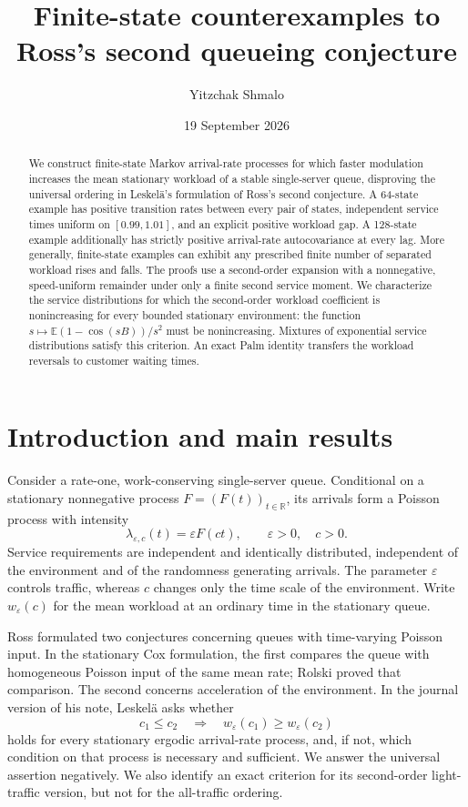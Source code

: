\documentclass[11pt,reqno]{amsart}
\title[Counterexamples to Ross's second queueing conjecture]{Finite-state counterexamples to Ross's second queueing conjecture}
\author{Yitzchak Shmalo}
\date{19 September 2026}
\numberwithin{equation}{section}
\theoremstyle{plain}
\theoremstyle{definition}
\newcommand{\E}{\mathbb E}
\newcommand{\R}{\mathbb R}
\newcommand{\1}{\mathbf 1}
\newcommand{\eps}{\varepsilon}
\begin{document}
\begin{abstract}
We construct finite-state Markov arrival-rate processes for which faster modulation increases the mean stationary workload of a stable single-server queue, disproving the universal ordering in Leskel\"a's formulation of Ross's second conjecture. A 64-state example has positive transition rates between every pair of states, independent service times uniform on $[0.99,1.01]$, and an explicit positive workload gap. A 128-state example additionally has strictly positive arrival-rate autocovariance at every lag. More generally, finite-state examples can exhibit any prescribed finite number of separated workload rises and falls. The proofs use a second-order expansion with a nonnegative, speed-uniform remainder under only a finite second service moment. We characterize the service distributions for which the second-order workload coefficient is nonincreasing for every bounded stationary environment: the function $s\mapsto\E(1-\cos(sB))/s^2$ must be nonincreasing. Mixtures of exponential service distributions satisfy this criterion. An exact Palm identity transfers the workload reversals to customer waiting times.
\end{abstract}
\maketitle


\section{Introduction and main results}\label{sec:intro}
Consider a rate-one, work-conserving single-server queue. Conditional on a stationary nonnegative process $F=(F(t))_{t\in\R}$, its arrivals form a Poisson process with intensity
\begin{equation}\label{eq:arrival}
 \lambda_{\eps,c}(t)=\eps F(ct),\qquad \eps>0,\quad c>0.
\end{equation}
Service requirements are independent and identically distributed, independent of the environment and of the randomness generating arrivals. The parameter $\eps$ controls traffic, whereas $c$ changes only the time scale of the environment. Write $w_\eps(c)$ for the mean workload at an ordinary time in the stationary queue.

Ross \cite{Ross78} formulated two conjectures concerning queues with time-varying Poisson input. In the stationary Cox formulation, the first compares the queue with homogeneous Poisson input of the same mean rate; Rolski \cite{Rolski81} proved that comparison. The second concerns acceleration of the environment. In the journal version of his note, Leskel\"a \cite[Problem~1, p.~214]{Leskela22} asks whether
\begin{equation}\label{eq:ross}
 c_1\le c_2\quad\Longrightarrow\quad w_\eps(c_1)\ge w_\eps(c_2)
\end{equation}
holds for every stationary ergodic arrival-rate process, and, if not, which condition on that process is necessary and sufficient. We answer the universal assertion negatively. We also identify an exact criterion for its second-order light-traffic version, but not for the all-traffic ordering.
\end{document}
